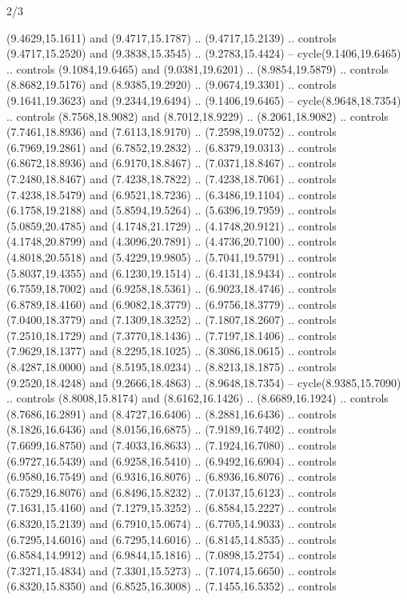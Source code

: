 \begin{flagdescription}{2/3}
\begin{scope}[yshift=\flagwidth,scale=\flagwidth/1241.93737]
\begin{scope}[y=-1mm, x=1mm,draw=gold,fill=blue,line join=miter,miter limit=4,line width=1.8\lw]
{  (9.4629,15.1611) and (9.4717,15.1787) .. (9.4717,15.2139) .. controls
  (9.4717,15.2520) and (9.3838,15.3545) .. (9.2783,15.4424) --
  cycle(9.1406,19.6465) .. controls (9.1084,19.6465) and (9.0381,19.6201) ..
  (8.9854,19.5879) .. controls (8.8682,19.5176) and (8.9385,19.2920) ..
  (9.0674,19.3301) .. controls (9.1641,19.3623) and (9.2344,19.6494) ..
  (9.1406,19.6465) -- cycle(8.9648,18.7354) .. controls (8.7568,18.9082) and
  (8.7012,18.9229) .. (8.2061,18.9082) .. controls (7.7461,18.8936) and
  (7.6113,18.9170) .. (7.2598,19.0752) .. controls (6.7969,19.2861) and
  (6.7852,19.2832) .. (6.8379,19.0313) .. controls (6.8672,18.8936) and
  (6.9170,18.8467) .. (7.0371,18.8467) .. controls (7.2480,18.8467) and
  (7.4238,18.7822) .. (7.4238,18.7061) .. controls (7.4238,18.5479) and
  (6.9521,18.7236) .. (6.3486,19.1104) .. controls (6.1758,19.2188) and
  (5.8594,19.5264) .. (5.6396,19.7959) .. controls (5.0859,20.4785) and
  (4.1748,21.1729) .. (4.1748,20.9121) .. controls (4.1748,20.8799) and
  (4.3096,20.7891) .. (4.4736,20.7100) .. controls (4.8018,20.5518) and
  (5.4229,19.9805) .. (5.7041,19.5791) .. controls (5.8037,19.4355) and
  (6.1230,19.1514) .. (6.4131,18.9434) .. controls (6.7559,18.7002) and
  (6.9258,18.5361) .. (6.9023,18.4746) .. controls (6.8789,18.4160) and
  (6.9082,18.3779) .. (6.9756,18.3779) .. controls (7.0400,18.3779) and
  (7.1309,18.3252) .. (7.1807,18.2607) .. controls (7.2510,18.1729) and
  (7.3770,18.1436) .. (7.7197,18.1406) .. controls (7.9629,18.1377) and
  (8.2295,18.1025) .. (8.3086,18.0615) .. controls (8.4287,18.0000) and
  (8.5195,18.0234) .. (8.8213,18.1875) .. controls (9.2520,18.4248) and
  (9.2666,18.4863) .. (8.9648,18.7354) -- cycle(8.9385,15.7090) .. controls
  (8.8008,15.8174) and (8.6162,16.1426) .. (8.6689,16.1924) .. controls
  (8.7686,16.2891) and (8.4727,16.6406) .. (8.2881,16.6436) .. controls
  (8.1826,16.6436) and (8.0156,16.6875) .. (7.9189,16.7402) .. controls
  (7.6699,16.8750) and (7.4033,16.8633) .. (7.1924,16.7080) .. controls
  (6.9727,16.5439) and (6.9258,16.5410) .. (6.9492,16.6904) .. controls
  (6.9580,16.7549) and (6.9316,16.8076) .. (6.8936,16.8076) .. controls
  (6.7529,16.8076) and (6.8496,15.8232) .. (7.0137,15.6123) .. controls
  (7.1631,15.4160) and (7.1279,15.3252) .. (6.8584,15.2227) .. controls
  (6.8320,15.2139) and (6.7910,15.0674) .. (6.7705,14.9033) .. controls
  (6.7295,14.6016) and (6.7295,14.6016) .. (6.8145,14.8535) .. controls
  (6.8584,14.9912) and (6.9844,15.1816) .. (7.0898,15.2754) .. controls
  (7.3271,15.4834) and (7.3301,15.5273) .. (7.1074,15.6650) .. controls
  (6.8320,15.8350) and (6.8525,16.3008) .. (7.1455,16.5352) .. controls
}
\end{scope}
\end{scope}
\end{flagdescription}
